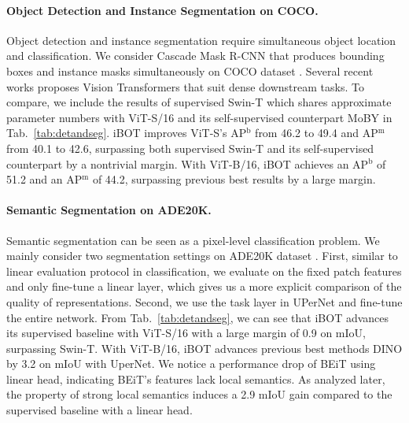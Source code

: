 \documentclass{article} %
\def\ourmethod{{iBOT}\xspace}
\begin{document}
\paragraph{Object Detection and Instance Segmentation on COCO.} 
Object detection and instance segmentation require simultaneous object location and classification.%
We consider Cascade Mask R-CNN \citep{cascadercnn,maskrcnn} that produces bounding boxes and instance masks simultaneously on COCO dataset \citep{coco}.  
Several recent works \citep{swin,pvt} proposes Vision Transformers that suit dense downstream tasks. To compare, we include the results of supervised Swin-T \citep{swin} which shares approximate parameter numbers with ViT-S/16 and its self-supervised counterpart MoBY \citep{moby} in Tab.~\ref{tab:detandseg}.
\ourmethod improves ViT-S's AP$^\mathrm{b}$ from 46.2 to 49.4 and AP$^\mathrm{m}$ from 40.1 to 42.6, surpassing both supervised Swin-T and its self-supervised counterpart by a nontrivial margin.
With ViT-B/16, \ourmethod achieves an AP$^\mathrm{b}$ of 51.2 and an AP$^\mathrm{m}$ of 44.2, surpassing previous best results by a large margin.

\paragraph{Semantic Segmentation on ADE20K.} 
Semantic segmentation can be seen as a pixel-level classification problem. %
We mainly consider two segmentation settings on ADE20K dataset \citep{ade20k}. 
First, similar to linear evaluation protocol in classification, we evaluate on the fixed patch features and only fine-tune a linear layer, which gives us a more explicit comparison of the quality of representations. 
Second, we use the task layer in UPerNet \citep{upernet} and fine-tune the entire network. 
From Tab.~\ref{tab:detandseg}, we can see that \ourmethod advances its supervised baseline with ViT-S/16 with a large margin of 0.9 on mIoU, surpassing Swin-T. With ViT-B/16, \ourmethod advances previous best methods DINO by 3.2 on mIoU with UperNet. We notice a performance drop of BEiT using linear head, indicating BEiT's features lack local semantics. As analyzed later, the property of strong local semantics induces a 2.9 mIoU gain compared to the supervised baseline with a linear head.
\end{document}
